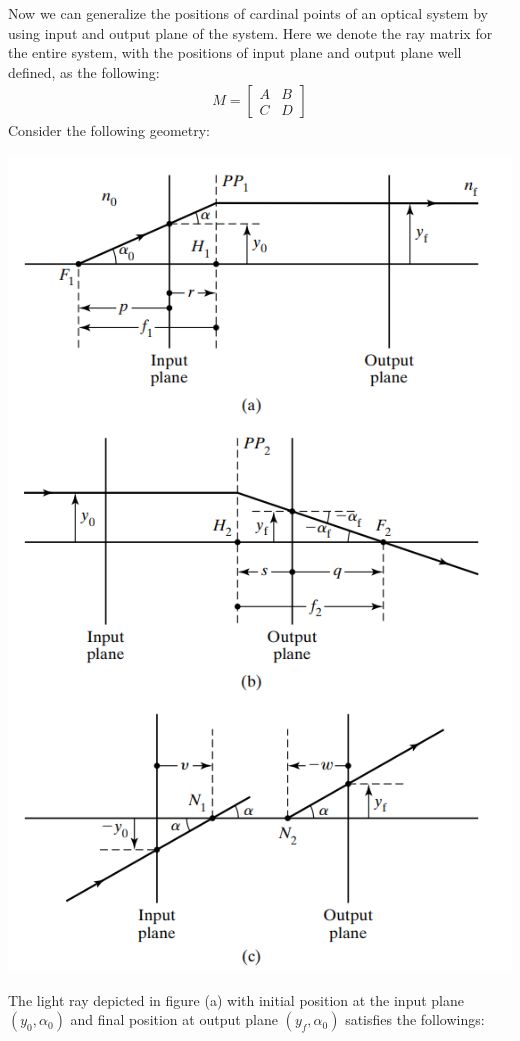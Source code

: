 \documentclass[11pt]{book}
\theoremstyle{break}
\theoremstyle{break}
\newcommand{\bmat}[1]{\begin{bmatrix} #1 \end{bmatrix}}
\begin{document}
\newpage
Now we can generalize the positions of cardinal points of an optical system by using input and output plane of the system. Here we denote the ray matrix for the entire system, with the positions of input plane and output plane well defined, as the following:
\begin{align*}
M = \bmat{A & B \\ C & D}
\end{align*}
Consider the following geometry:
\begin{center}
\includegraphics[scale=0.62]{sepCP.png}
\end{center}
The light ray depicted in figure (a) with initial position at the input plane $(y_0, \alpha_0)$ and final position at output plane $(y_f, \alpha_0)$ satisfies the followings:
\end{document}
